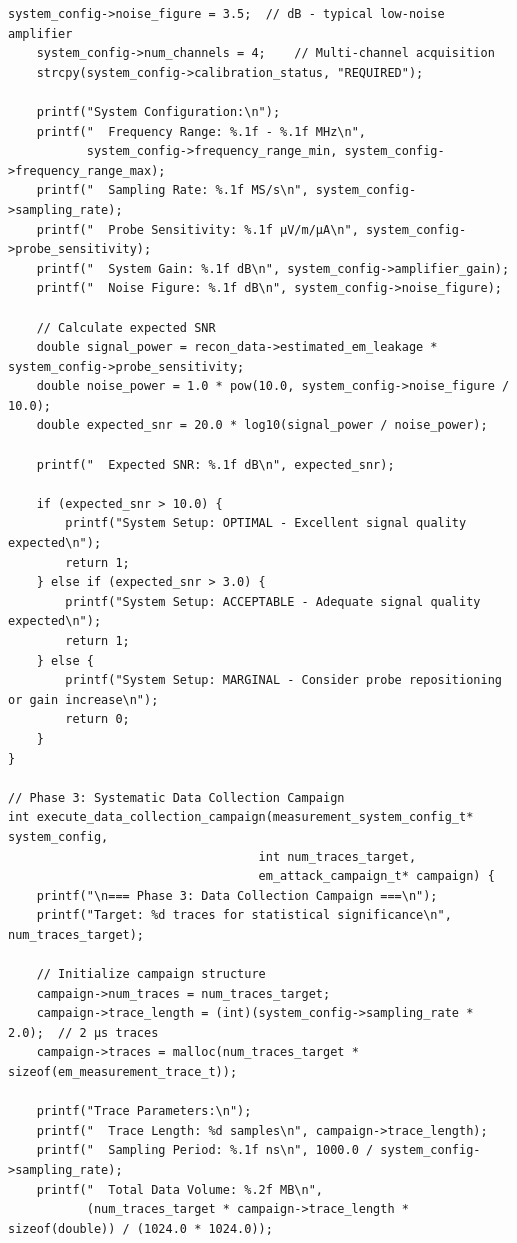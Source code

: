 \documentclass[11pt,a4paper]{article}
\theoremstyle{definition}
\begin{document}
\begin{lstlisting}[caption={Complete EM Attack Methodology Framework Implementation}]
    system_config->noise_figure = 3.5;  // dB - typical low-noise amplifier
    system_config->num_channels = 4;    // Multi-channel acquisition
    strcpy(system_config->calibration_status, "REQUIRED");
    
    printf("System Configuration:\n");
    printf("  Frequency Range: %.1f - %.1f MHz\n", 
           system_config->frequency_range_min, system_config->frequency_range_max);
    printf("  Sampling Rate: %.1f MS/s\n", system_config->sampling_rate);
    printf("  Probe Sensitivity: %.1f μV/m/μA\n", system_config->probe_sensitivity);
    printf("  System Gain: %.1f dB\n", system_config->amplifier_gain);
    printf("  Noise Figure: %.1f dB\n", system_config->noise_figure);
    
    // Calculate expected SNR
    double signal_power = recon_data->estimated_em_leakage * system_config->probe_sensitivity;
    double noise_power = 1.0 * pow(10.0, system_config->noise_figure / 10.0);
    double expected_snr = 20.0 * log10(signal_power / noise_power);
    
    printf("  Expected SNR: %.1f dB\n", expected_snr);
    
    if (expected_snr > 10.0) {
        printf("System Setup: OPTIMAL - Excellent signal quality expected\n");
        return 1;
    } else if (expected_snr > 3.0) {
        printf("System Setup: ACCEPTABLE - Adequate signal quality expected\n");
        return 1;
    } else {
        printf("System Setup: MARGINAL - Consider probe repositioning or gain increase\n");
        return 0;
    }
}

// Phase 3: Systematic Data Collection Campaign
int execute_data_collection_campaign(measurement_system_config_t* system_config,
                                   int num_traces_target,
                                   em_attack_campaign_t* campaign) {
    printf("\n=== Phase 3: Data Collection Campaign ===\n");
    printf("Target: %d traces for statistical significance\n", num_traces_target);
    
    // Initialize campaign structure
    campaign->num_traces = num_traces_target;
    campaign->trace_length = (int)(system_config->sampling_rate * 2.0);  // 2 μs traces
    campaign->traces = malloc(num_traces_target * sizeof(em_measurement_trace_t));
    
    printf("Trace Parameters:\n");
    printf("  Trace Length: %d samples\n", campaign->trace_length);
    printf("  Sampling Period: %.1f ns\n", 1000.0 / system_config->sampling_rate);
    printf("  Total Data Volume: %.2f MB\n", 
           (num_traces_target * campaign->trace_length * sizeof(double)) / (1024.0 * 1024.0));
    

\end{lstlisting}
\end{document}
